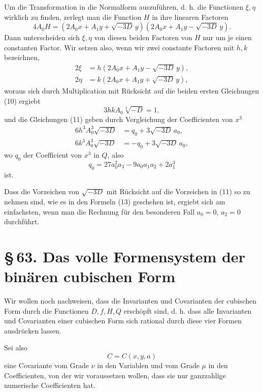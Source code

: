 \documentclass[11pt]{article}
\providecommand{\sect}[2]{\section*{\S\,#1. #2}}
\begin{document}
Um die Transformation in die Normalform auszuführen, d. h. die Functionen $\xi,\eta$ wirklich zu finden, zerlegt man die Function $H$ in ihre linearen Factoren
\[
 4A_0H=(2A_0x+A_1y+\sqrt{-3D}\,y)(2A_0x+A_1y-\sqrt{-3D}\,y).
\]
Dann unterscheiden sich $\xi,\eta$ von diesen beiden Factoren von $H$ nur um je einen constanten Factor. Wir setzen also, wenn wir zwei constante Factoren mit $h,k$ bezeichnen,
\begin{equation}
\begin{aligned}
 2\xi&=h(2A_0x+A_1y-\sqrt{-3D}\,y),\\
 2\eta&=k(2A_0x+A_1y+\sqrt{-3D}\,y),
\end{aligned}
\tag{13}
\end{equation}
woraus sich durch Multiplication mit Rücksicht auf die beiden ersten Gleichungen (10) ergiebt
\begin{equation}
 3hkA_0\sqrt[3]{-D}=1,
\tag{14}
\end{equation}
und die Gleichungen (11) geben durch Vergleichung der Coefficienten von $x^3$
\begin{equation}
\begin{aligned}
 6h^3A_0^3\sqrt{-3D}&=q_0+3\sqrt{-3D}\,a_0,\\
 6k^3A_0^3\sqrt{-3D}&=-q_0+3\sqrt{-3D}\,a_0,
\end{aligned}
\tag{15}
\end{equation}
wo $q_0$ der Coefficient von $x^3$ in $Q$, also
\begin{equation}
 q_0=27a_0^2a_3-9a_0a_1a_2+2a_1^3
\tag{16}
\end{equation}
ist.

Dass die Vorzeichen von $\sqrt{-3D}$ mit Rücksicht auf die Vorzeichen in (11) so zu nehmen sind, wie es in den Formeln (13) geschehen ist, ergiebt sich am einfachsten, wenn man die Rechnung für den besonderen Fall $a_0=0$, $a_2=0$ durchführt.

\sect{63}{Das volle Formensystem der binären cubischen Form}

Wir wollen noch nachweisen, dass die Invarianten und Covarianten der cubischen Form durch die Functionen $D,f,H,Q$ erschöpft sind, d. h. dass alle Invarianten und Covarianten einer cubischen Form sich rational durch diese vier Formen ausdrücken lassen.

Sei also
\[
 C=C(x,y,a)
\]
eine Covariante vom Grade $\nu$ in den Variablen und vom Grade $\mu$ in den Coefficienten, von der wir voraussetzen wollen, dass sie nur ganzzahlige numerische Coefficienten hat.
\end{document}
